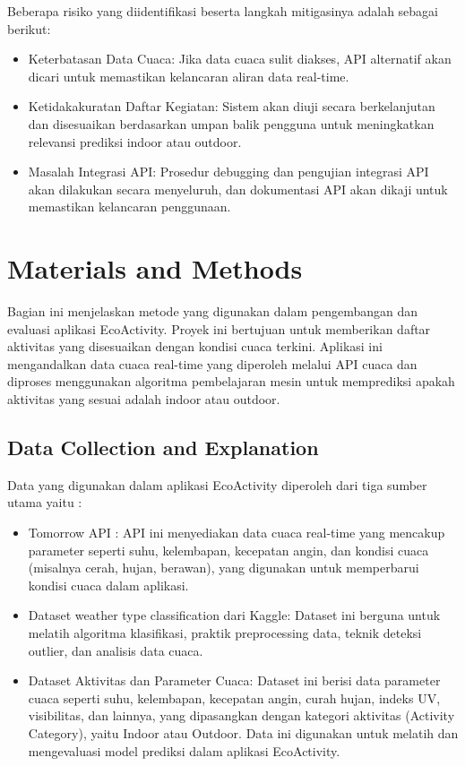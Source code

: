 \documentclass[journal,article,submit,pdftex,moreauthors]{Definitions/mdpi}
\begin{document}
Beberapa risiko yang diidentifikasi beserta langkah mitigasinya adalah sebagai berikut: 
\begin{itemize} 
\item Keterbatasan Data Cuaca: Jika data cuaca sulit diakses, API alternatif akan dicari untuk memastikan kelancaran aliran data real-time. 
\item Ketidakakuratan Daftar Kegiatan: Sistem akan diuji secara berkelanjutan dan disesuaikan berdasarkan umpan balik pengguna untuk meningkatkan relevansi prediksi indoor atau outdoor. 
\item Masalah Integrasi API: Prosedur debugging dan pengujian integrasi API akan dilakukan secara menyeluruh, dan dokumentasi API akan dikaji untuk memastikan kelancaran penggunaan. 
\end{itemize}

\section{Materials and Methods}

Bagian ini menjelaskan metode yang digunakan dalam pengembangan dan evaluasi aplikasi EcoActivity. Proyek ini bertujuan untuk memberikan daftar aktivitas yang disesuaikan dengan kondisi cuaca terkini. Aplikasi ini mengandalkan data cuaca real-time yang diperoleh melalui API cuaca dan diproses menggunakan algoritma pembelajaran mesin untuk memprediksi apakah aktivitas yang sesuai adalah indoor atau outdoor.


\subsection{Data Collection and Explanation}
Data yang digunakan dalam aplikasi EcoActivity diperoleh dari tiga sumber utama yaitu :
\begin{itemize}
    \item Tomorrow API : API ini menyediakan data cuaca real-time yang mencakup parameter seperti suhu, kelembapan, kecepatan angin, dan kondisi cuaca (misalnya cerah, hujan, berawan), yang digunakan untuk memperbarui kondisi cuaca dalam aplikasi.
    \item Dataset weather type classification dari Kaggle: Dataset ini berguna untuk melatih algoritma klasifikasi, praktik preprocessing data, teknik deteksi outlier, dan analisis data cuaca.
    \item Dataset Aktivitas dan Parameter Cuaca: Dataset ini berisi data parameter cuaca seperti suhu, kelembapan, kecepatan angin, curah hujan, indeks UV, visibilitas, dan lainnya, yang dipasangkan dengan kategori aktivitas (Activity Category), yaitu Indoor atau Outdoor. Data ini digunakan untuk melatih dan mengevaluasi model prediksi dalam aplikasi EcoActivity.
\end{itemize}
\end{document}
